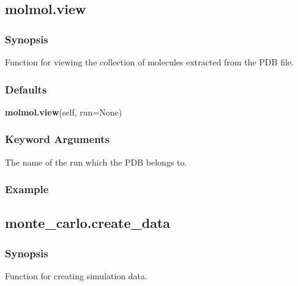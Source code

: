 
  

 \newpage 

 \subsection{molmol.view} 

  
 \subsubsection{Synopsis} 

 Function for viewing the collection of molecules extracted from the PDB file. 
  

  
 \subsubsection{Defaults} 

 \textsf{\textbf{molmol.view}(self, run=None)} 

  
 \subsubsection{Keyword Arguments} 

   The name of the run which the PDB belongs to.  

  

  
 \subsubsection{Example} 



  

 \newpage 

 \subsection{monte\_carlo.create\_data} 

  
 \subsubsection{Synopsis} 

 Function for creating simulation data. 
  

